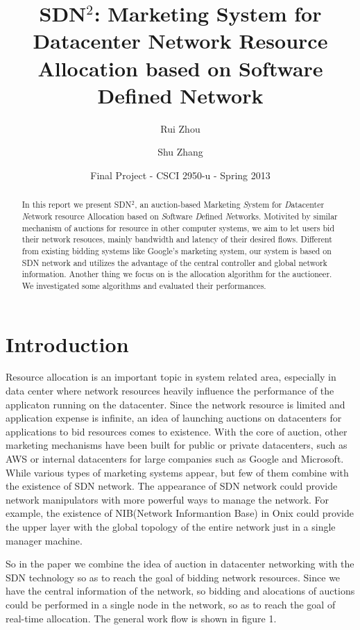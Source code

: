 \documentclass[a4paper,11pt,twocolumn]{article}
\begin{document}
\title{SDN$^{2}$: Marketing System for Datacenter Network Resource Allocation based on Software Defined Network}
\author{Rui Zhou \and Shu Zhang}
\date{Final Project - CSCI 2950-u - Spring 2013}
\maketitle

\begin{abstract}
In this report we present SDN$^{2}$, an auction-based Marketing \emph{S}ystem for \emph{D}atacenter \emph{N}etwork resource Allocation based on \emph{S}oftware \emph{D}efined \emph{N}etworks.
Motivited by similar mechanism of auctions for resource in other computer systems, we aim to 
let users bid their network resouces, mainly bandwidth and latency of their desired flows. Different from existing 
bidding systems like Google's marketing system\cite{google}, our system is based on SDN network and utilizes the advantage
of the central controller and global network information. 
Another thing we focus on is the allocation algorithm for the auctioneer. We investigated some 
algorithms and evaluated their performances. 
\end{abstract}

\section{Introduction}
Resource allocation is an important topic in system related area, especially in data center where network resources heavily influence the performance 
of the applicaton running on the datacenter. Since the network resource is limited and application expense is infinite, an idea of launching auctions on
datacenters for applications to bid resources comes to existence. With the core of auction, other marketing mechanisms have been built for public or 
private datacenters, such as AWS\cite{aws} or internal datacenters for large companies such as Google and Microsoft. While various types of marketing systems
appear, but few of them combine with the existence of SDN network. The appearance of SDN network could provide network manipulators with more powerful 
ways to manage the network. For example, the existence of NIB(Network Informantion Base) in Onix\cite{onix} could provide the upper layer with the global
topology of the entire network just in a single manager machine. 

So in the paper we combine the idea of auction in datacenter networking with the SDN technology so as to reach the goal of bidding network resources. 
Since we have the central information of the network, so bidding and alocations of auctions could be performed in a single node in the network, so as to
reach the goal of real-time allocation. The general work flow is shown in figure 1. 
\end{document}
